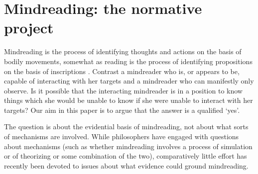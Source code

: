 \documentclass[14pt,a4paper]{extarticle}
\begin{document}
\section{Mindreading: the normative project}
\label{sec:intro}

Mindreading is
the process of identifying thoughts and actions on the basis of bodily movements,
somewhat as reading is the process of identifying propositions on the basis of inscriptions \citep[p.\ 4]{Apperly:2010kx}.
Contrast
a mindreader who is, or appears to be, capable of interacting with her targets 
and
a mindreader who can manifestly only observe.
Is it possible that the interacting mindreader is in a position to know things which she would be unable to know if she were unable to interact with her targets?
Our aim in this paper is to argue that the answer is a qualified `yes'.

The question is about the evidential basis of mindreading, 
not about what sorts of mechanisms are involved.
While philosophers have engaged with questions about mechanisms (such as whether mindreading involves a process of simulation or of theorizing or some combination of the two),
comparatively little effort has recently been devoted to issues about what evidence could ground mindreading.
\end{document}

